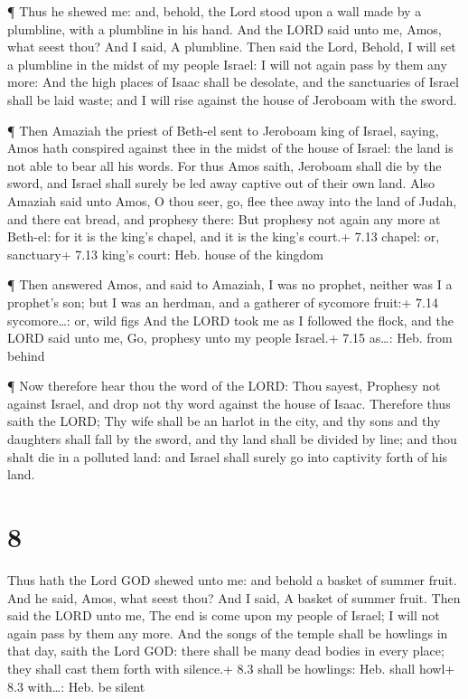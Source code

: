  ¶ Thus he shewed me: and, behold, the Lord stood upon a
wall made by a plumbline, with a plumbline in his hand.  And
the LORD said unto me, Amos, what seest thou? And I said, A plumbline.
Then said the Lord, Behold, I will set a plumbline in the midst of my
people Israel: I will not again pass by them any more:  And
the high places of Isaac shall be desolate, and the sanctuaries of
Israel shall be laid waste; and I will rise against the house of
Jeroboam with the sword.

 ¶ Then Amaziah the priest of Beth-el sent to Jeroboam king
of Israel, saying, Amos hath conspired against thee in the midst of the
house of Israel: the land is not able to bear all his words.
 For thus Amos saith, Jeroboam shall die by the sword, and
Israel shall surely be led away captive out of their own land.
 Also Amaziah said unto Amos, O thou seer, go, flee thee
away into the land of Judah, and there eat bread, and prophesy there:
 But prophesy not again any more at Beth-el: for it is the
king's chapel, and it is the king's court.+ 7.13 chapel: or, sanctuary+
7.13 king's court: Heb. house of the kingdom

 ¶ Then answered Amos, and said to Amaziah, I was no
prophet, neither was I a prophet's son; but I was an herdman, and a
gatherer of sycomore fruit:+ 7.14 sycomore\ldots: or, wild figs
 And the LORD took me as I followed the flock, and the LORD
said unto me, Go, prophesy unto my people Israel.+ 7.15 as\ldots: Heb.
from behind

 ¶ Now therefore hear thou the word of the LORD: Thou
sayest, Prophesy not against Israel, and drop not thy word against the
house of Isaac.  Therefore thus saith the LORD; Thy wife
shall be an harlot in the city, and thy sons and thy daughters shall
fall by the sword, and thy land shall be divided by line; and thou shalt
die in a polluted land: and Israel shall surely go into captivity forth
of his land.

\hypertarget{section-7}{%
\section{8}\label{section-7}}

 Thus hath the Lord GOD shewed unto me: and behold a basket
of summer fruit.  And he said, Amos, what seest thou? And I
said, A basket of summer fruit. Then said the LORD unto me, The end is
come upon my people of Israel; I will not again pass by them any more.
 And the songs of the temple shall be howlings in that day,
saith the Lord GOD: there shall be many dead bodies in every place; they
shall cast them forth with silence.+ 8.3 shall be howlings: Heb. shall
howl+ 8.3 with\ldots: Heb. be silent

